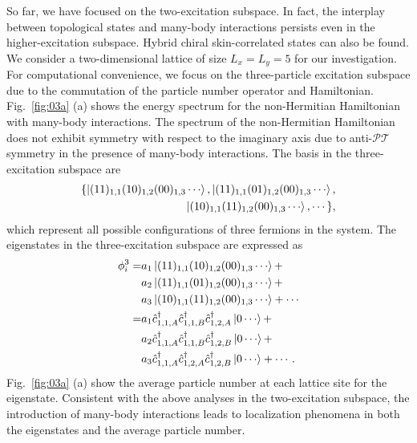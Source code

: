 \documentclass[longbibliography, aps, prx, amsmath, amssymb, amsfonts, twocolumn,superscriptaddress, footinbib]{revtex4-1}
\begin{document}
	So far, we have focused on the two-excitation subspace. In fact, the interplay between topological states and many-body interactions persists even in the higher-excitation subspace. Hybrid chiral skin-correlated states can also be found. 
	We consider a two-dimensional lattice of size $L_x = L_y = 5$ for our investigation. For computational convenience, we focus on the three-particle excitation subspace due to the commutation of the particle number operator and Hamiltonian. 
	Fig.~\ref{fig:03a} (a) shows the energy spectrum
	for the non-Hermitian Hamiltonian with many-body interactions. 
	The spectrum of the non-Hermitian Hamiltonian does not exhibit symmetry with respect to the imaginary axis due to anti-$\mathcal{PT}$ symmetry in the presence of many-body interactions. 
	The basis in the three-excitation subspace are
	\begin{equation}
		\begin{split}
		\{\ket{(11)_{1,1}(10)_{1,2}(00)_{1,3}\cdots}, \ket{(11)_{1,1}(01)_{1,2}(00)_{1,3}\cdots}, \\
		\ket{(10)_{1,1}(11)_{1,2}(00)_{1,3}\cdots},\cdots\}, 
		\end{split}
	\end{equation}
	which represent all possible configurations of three fermions in the system. 
	The eigenstates in the three-excitation subspace are expressed as 
	\begin{equation}
		\begin{split}
			\phi_i^3 =& a_1 \ket{(11)_{1,1}(10)_{1,2}(00)_{1,3}\cdots} +\\
			&a_2 \ket{(11)_{1,1}(01)_{1,2}(00)_{1,3}\cdots} +\\
			&a_3 \ket{(10)_{1,1}(11)_{1,2}(00)_{1,3}\cdots} + \cdots\\
			=& a_1 \hat{c}_{1,1,A}^{\dagger}\hat{c}_{1,1,B}^{\dagger}\hat{c}_{1,2,A}^{\dagger} \ket{0\cdots} +\\
			&a_2 \hat{c}_{1,1,A}^{\dagger}\hat{c}_{1,1,B}^{\dagger}\hat{c}_{1,2,B}^{\dagger} \ket{0\cdots} + \\
			&a_3 \hat{c}_{1,1,A}^{\dagger}\hat{c}_{1,2,A}^{\dagger}\hat{c}_{1,2,B}^{\dagger} \ket{0\cdots} + \cdots.
		\end{split}
	\end{equation}
	Fig.~\ref{fig:03a} (a) show the average particle number at each lattice site for the eigenstate. 
	Consistent with the above analyses in the two-excitation subspace, the introduction of many-body interactions leads to localization phenomena in both the eigenstates and the average particle number.
\end{document}
